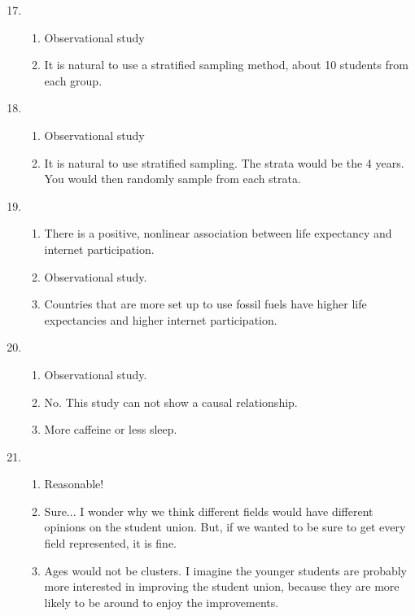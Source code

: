 \documentclass[12pt,letterpaper]{article}
\begin{document}
\begin{enumerate}
\setcounter{enumi}{16}
\item \begin{enumerate}
\item Observational study
\item It is natural to use a stratified sampling method, about 10 students from each group.
\end{enumerate}

\item \begin{enumerate}
\item Observational study
\item It is natural to use stratified sampling. The strata would be the 4 years. You would then randomly sample from each strata.
\end{enumerate}

\item \begin{enumerate}
\item There is a positive, nonlinear association between life expectancy and internet participation.
\item Observational study.
\item Countries that are more set up to use fossil fuels have higher life expectancies and higher internet participation.
\end{enumerate}

\item \begin{enumerate}
\item Observational study.
\item No. This study can not show a causal relationship.
\item More caffeine or less sleep.
\end{enumerate}

\item \begin{enumerate}
\item Reasonable!
\item Sure... I wonder why we think different fields would have different opinions on the student union. But, if we wanted to be sure to get every field represented, it is fine.
\item Ages would not be clusters. I imagine the younger students are probably more interested in improving the student union, because they are more likely to be around to enjoy the improvements.
\end{enumerate}


\end{enumerate}
\end{document}
